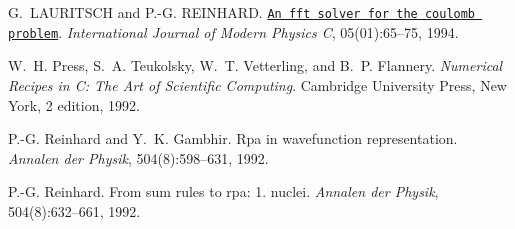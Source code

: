 
\begin{DoxyDescription}
\item[\label{_CITEREF_Lauritsch94}%
\mbox{[}1\mbox{]}]G.~L\+A\+U\+R\+I\+T\+S\+CH and P.-\/G. R\+E\+I\+N\+H\+A\+RD. \href{https://doi.org/10.1142/S0129183194000064}{\tt An fft solver for the coulomb problem}. {\itshape International Journal of Modern Physics C}, 05(01)\+:65--75, 1994. 


\item[\label{_CITEREF_Pre92aB}%
\mbox{[}2\mbox{]}]W.~H. Press, S.~A. Teukolsky, W.~T. Vetterling, and B.~P. Flannery. {\itshape Numerical Recipes in C\+: The Art of Scientific Computing}. Cambridge University Press, New York, 2 edition, 1992.


\item[\label{_CITEREF_Reinhard1992}%
\mbox{[}3\mbox{]}]P.-\/G. Reinhard and Y.~K. Gambhir. Rpa in wavefunction representation. {\itshape Annalen der Physik}, 504(8)\+:598--631, 1992. 


\item[\label{_CITEREF_Reinhard1992a}%
\mbox{[}4\mbox{]}]P.-\/G. Reinhard. From sum rules to rpa\+: 1. nuclei. {\itshape Annalen der Physik}, 504(8)\+:632--661, 1992. 


\end{DoxyDescription}
